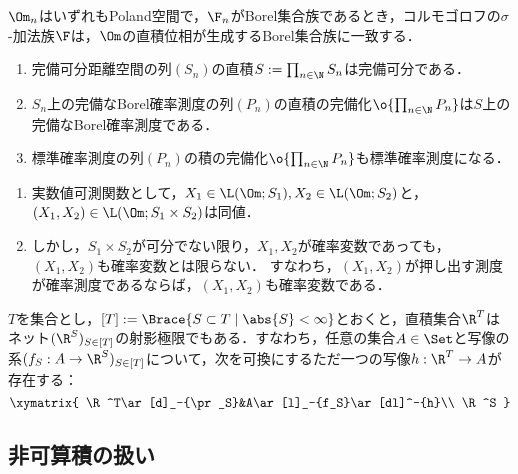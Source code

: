 \documentclass[uplatex,dvipdfmx]{jsreport}
\begin{document}
\begin{theorem}\label{thm-product-sigma-algebra}
    $\Om_n$はいずれもPoland空間で，$\F_n$がBorel集合族であるとき，コルモゴロフの$\sigma$-加法族$\F$は，$\Om$の直積位相が生成するBorel集合族に一致する．
\end{theorem}

\begin{theorem}[正則確率空間の可算直積]\mbox{}
    \begin{enumerate}
        \item 完備可分距離空間の列$(S_n)$の直積$S:=\prod_{n\in\N}S_n$は完備可分である．
        \item $S_n$上の完備なBorel確率測度の列$(P_n)$の直積の完備化$\o{\prod_{n\in\N}P_n}$は$S$上の完備なBorel確率測度である．
        \item 標準確率測度の列$(P_n)$の積の完備化$\o{\prod_{n\in\N}P_n}$も標準確率測度になる．
    \end{enumerate}
\end{theorem}

\begin{proposition}[積写像の可測性]\mbox{}
    \begin{enumerate}
        \item 実数値可測関数として，$X_1\in\L(\Om;S_1),X_2\in\L(\Om;S_2)$と，$(X_1,X_2)\in\L(\Om;S_1\times S_2)$は同値．
        \item しかし，$S_1\times S_2$が可分でない限り，$X_1,X_2$が確率変数であっても，$(X_1,X_2)$も確率変数とは限らない．
        すなわち，$(X_1,X_2)$が押し出す測度が確率測度であるならば，$(X_1,X_2)$も確率変数である．
    \end{enumerate}
\end{proposition}

\begin{theorem}[非可算無限直積のSet上の特徴付け]
    $T$を集合とし，$[T]:=\Brace{S\subset T\mid\abs{S}<\infty}$とおくと，直積集合$\R^T$はネット$(\R^S)_{S\in[T]}$の射影極限でもある．すなわち，任意の集合$A\in\Set$と写像の系$(f_S:A\to\R^S)_{S\in[T]}$について，次を可換にするただ一つの写像$h:\R^T\to A$が存在する：
    \[\xymatrix{
        \R^T\ar[d]_-{\pr_S}&A\ar[l]_-{f_S}\ar[dl]^-{h}\\ \R^S
    }\]
\end{theorem}

\subsection{非可算積の扱い}
\end{document}
